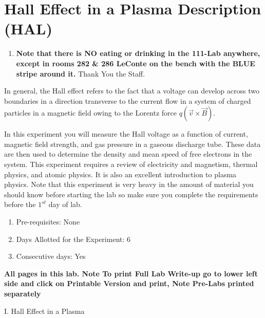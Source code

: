 \documentclass{../lab}
\begin{document}
\maketitle

\tableofcontents

\newpage

\section{Hall Effect in a Plasma Description (HAL)}

\begin{enumerate}
    \item \textbf{Note that there is NO eating or drinking in the 111-Lab anywhere, except in rooms 282 \& 286 LeConte on the bench with the BLUE stripe around it.} Thank You the Staff.
\end{enumerate}

In general, the Hall effect refers to the fact that a voltage can develop across two boundaries in a direction transverse to the current flow in a system of charged particles in a magnetic field owing to the Lorentz force $q (\vec{v} \times \vec{B})$.

In this experiment you will measure the Hall voltage as a function of current, magnetic field strength, and gas pressure in a gaseous discharge tube. These data are then used to determine the density and mean speed of free electrons in the system. This experiment requires a review of electricity and magnetism, thermal physics, and atomic physics. It is also an excellent introduction to plasma physics. Note that this experiment is very heavy in the amount of material you should know before starting the lab so make sure you complete the requirements before the $1^{st}$ day of lab.

\begin{enumerate}
    \item Pre-requisites: None

    \item Days Allotted for the Experiment: 6

    \item Consecutive days: Yes

\end{enumerate}

\textbf{All pages in this lab. Note To print Full Lab Write-up go to lower left side and click on Printable Version and print, Note Pre-Labs printed separately }

I. Hall Effect in a Plasma
\end{document}
